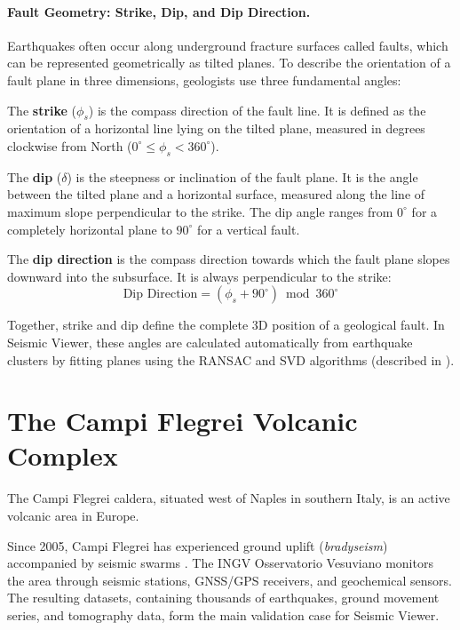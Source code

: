 \paragraph{Fault Geometry: Strike, Dip, and Dip Direction.}
Earthquakes often occur along underground fracture surfaces called faults, which can be represented geometrically as tilted planes. To describe the orientation of a fault plane in three dimensions, geologists use three fundamental angles:

The \textbf{strike} ($\phi_s$) is the compass direction of the fault line. It is defined as the orientation of a horizontal line lying on the tilted plane, measured in degrees clockwise from North ($0^\circ \le \phi_s < 360^\circ$).

The \textbf{dip} ($\delta$) is the steepness or inclination of the fault plane. It is the angle between the tilted plane and a horizontal surface, measured along the line of maximum slope perpendicular to the strike. The dip angle ranges from $0^\circ$ for a completely horizontal plane to $90^\circ$ for a vertical fault.

The \textbf{dip direction} is the compass direction towards which the fault plane slopes downward into the subsurface. It is always perpendicular to the strike:
\begin{equation}
    \text{Dip Direction} = (\phi_s + 90^\circ) \bmod 360^\circ
    \label{eq:dip-direction}
\end{equation}

Together, strike and dip define the complete 3D position of a geological fault. In Seismic Viewer, these angles are calculated automatically from earthquake clusters by fitting planes using the RANSAC \cite{fischler1981ransac} and SVD \cite{shakarji1998least} algorithms (described in ).

\section{The Campi Flegrei Volcanic Complex}
\label{sec:flegrei}

The Campi Flegrei caldera, situated west of Naples in southern Italy, is an active volcanic area in Europe.

Since 2005, Campi Flegrei has experienced ground uplift (\textit{bradyseism}) accompanied by seismic swarms \cite{desiena2017bradyseism}. The INGV Osservatorio Vesuviano monitors the area through seismic stations, GNSS/GPS receivers, and geochemical sensors. The resulting datasets, containing thousands of earthquakes, ground movement series, and tomography data, form the main validation case for Seismic Viewer.


